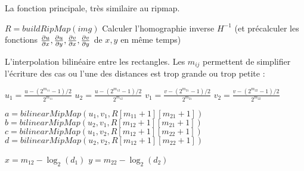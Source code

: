 La fonction principale, très similaire au ripmap.
\medbreak
\medbreak
\begin{algorithm}[H]
\caption{$mainFunction(img,H,img_f)$}
$R = buildRipMap(img)$\;
Calculer l'homographie inverse $H^{-1}$ (et précalculer les fonctions $\frac{\partial u}{\partial x},\frac{\partial u}{\partial y},\frac{\partial v}{\partial x},\frac{\partial v}{\partial y}$ de $x,y$ en même temps)\;
\end{algorithm}

\medbreak
\medbreak

L'interpolation bilinéaire entre les rectangles.
Les $m_{ij}$ permettent de simplifier l'écriture des cas ou l'une des distances est trop grande ou trop petite :

\medbreak
\medbreak

\begin{algorithm}[H]
\caption{$evalPixel((u,v),d_1,d_2,M)$}
$u_1=\frac{u-(2^{m_{11}}-1)/2}{2^{m_{11}}}$\;
$u_2=\frac{u-(2^{m_{12}}-1)/2}{2^{m_{12}}}$\;
$v_1=\frac{v-(2^{m_{21}}-1)/2}{2^{m_{21}}}$\;
$v_2=\frac{v-(2^{m_{22}}-1)/2}{2^{m_{22}}}$\;

$a=bilinearMipMap(u_1,v_1,R[m_{11}+1][m_{21}+1])$\;
$b=bilinearMipMap(u_2,v_1,R[m_{12}+1][m_{21}+1])$\;
$c=bilinearMipMap(u_1,v_2,R[m_{12}+1][m_{22}+1])$\;
$d=bilinearMipMap(u_2,v_2,R[m_{12}+1][m_{22}+1])$\;

$x = m_{12} - \log_2(d_1)$\;
$y = m_{22} - \log_2(d_2)$\;

\end{algorithm}


